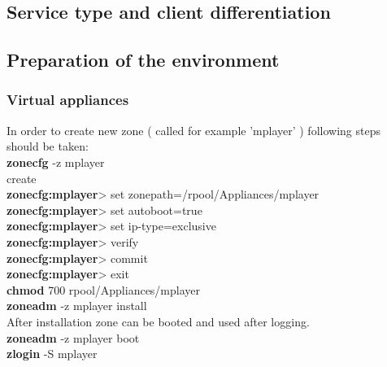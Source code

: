 \documentclass[11pt]{book}
\begin{document}
      \subsection{Service type and client differentiation}

      \subsection{Preparation of the environment}
      \label{sub:case:prep}

        \subsubsection{Virtual appliances}
        \label{ssub:case:prep:va}

        In order to create new zone ( called for example 'mplayer' ) following steps should be taken: \\

          \textbf{zonecfg} -z mplayer \\

          create \\
  
          \textbf{zonecfg:mplayer}> set zonepath=/rpool/Appliances/mplayer \\
 
          \textbf{zonecfg:mplayer}> set autoboot=true \\

          \textbf{zonecfg:mplayer}> set ip-type=exclusive \\

          \textbf{zonecfg:mplayer}> verify \\

          \textbf{zonecfg:mplayer}> commit \\

          \textbf{zonecfg:mplayer}> exit \\

          \textbf{chmod} 700 rpool/Appliances/mplayer \\

          \textbf{zoneadm} -z mplayer install \\

          After installation zone can be booted and used after logging. \\

          \textbf{zoneadm} -z mplayer boot \\

          \textbf{zlogin} -S mplayer \\
\end{document}
